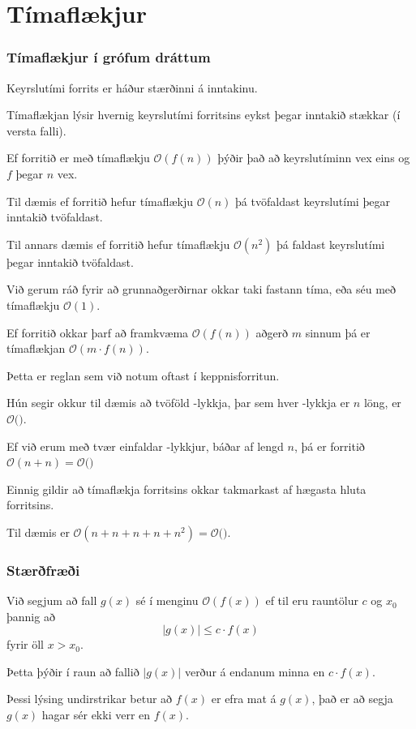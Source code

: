 \section{Tímaflækjur}
{
    \frametitle{Tímaflækjur í grófum dráttum}
    {
        \item<1-> Keyrslutími forrits er háður stærðinni á inntakinu.
        \item<2-> Tímaflækjan lýsir hvernig keyrslutími forritsins eykst þegar inntakið stækkar (í versta falli).
        \item<3-> Ef forritið er með tímaflækju $\mathcal{O}(f(n))$ þýðir það að keyrslutíminn vex eins og $f$ þegar $n$ vex.
        \item<4-> Til dæmis ef forritið hefur tímaflækju $\mathcal{O}(n)$ þá tvöfaldast keyrslutími þegar inntakið tvöfaldast.
        \item<5-> Til annars dæmis ef forritið hefur tímaflækju $\mathcal{O}(n^2)$ þá faldast keyrslutími þegar inntakið tvöfaldast.
        \item<7-> Við gerum ráð fyrir að grunnaðgerðirnar okkar taki fastann tíma, eða séu með tímaflækju $\mathcal{O}(1)$.
    }
}

{
    {
        \item<1-> Ef forritið okkar þarf að framkvæma $\mathcal{O}(f(n))$ aðgerð $m$ sinnum þá er tímaflækjan $\mathcal{O}(m \cdot f(n))$.
        \item<2-> Þetta er reglan sem við notum oftast í keppnisforritun.
        \item<3-> Hún segir okkur til dæmis að tvöföld -lykkja, þar sem hver -lykkja er $n$ löng, er
            $\mathcal{O}($$)$.
        \item<5-> Ef við erum með tvær einfaldar -lykkjur, báðar af lengd $n$, þá er forritið 
            $\mathcal{O}(n + n) = \mathcal{O}($$)$
        \item<7-> Einnig gildir að tímaflækja forritsins okkar takmarkast af hægasta hluta forritsins.
        \item<8-> Til dæmis er
            $\mathcal{O}(n + n + n + n + n^2) = \mathcal{O}($$)$.
    }
}

{
    \frametitle{Stærðfræði}
    {
        \item<1-> Við segjum að fall $g(x)$ sé í menginu $\mathcal{O}(f(x))$ ef til eru rauntölur $c$ og $x_0$ þannig að
                    \[
                        |g(x)| \leq c \cdot f(x)
                    \]
                    fyrir öll $x > x_0$.
        \item<2-> Þetta þýðir í raun að fallið $|g(x)|$ verður á endanum minna en $c \cdot f(x)$.
        \item<3-> Þessi lýsing undirstrikar betur að $f(x)$ er efra mat á $g(x)$, það er að segja $g(x)$ hagar sér ekki verr en $f(x)$.
    }
}

